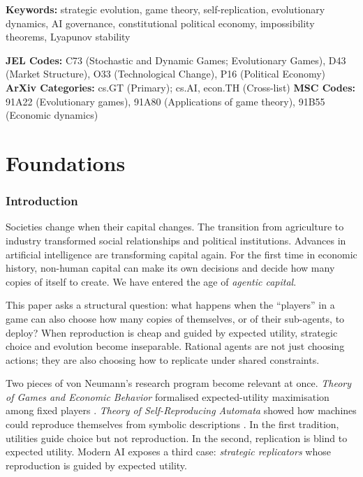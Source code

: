 \documentclass[12pt]{article}
\begin{document}
\noindent\textbf{Keywords:} strategic evolution, game theory, self-replication, evolutionary dynamics, AI governance, constitutional political economy, impossibility theorems, Lyapunov stability

\noindent\textbf{JEL Codes:} C73 (Stochastic and Dynamic Games; Evolutionary Games), D43 (Market Structure), O33 (Technological Change), P16 (Political Economy)
\noindent\textbf{ArXiv Categories:} cs.GT (Primary); cs.AI, econ.TH (Cross-list)
\noindent\textbf{MSC Codes:} 91A22 (Evolutionary games), 91A80 (Applications of game theory), 91B55 (Economic dynamics)

\newpage
\tableofcontents
\newpage


\part{Foundations}


\section{Introduction}

Societies change when their capital changes. The transition from agriculture to industry transformed social relationships and political institutions. Advances in artificial intelligence are transforming capital again. For the first time in economic history, non-human capital can make its own decisions and decide how many copies of itself to create. We have entered the age of \emph{agentic capital}.

This paper asks a structural question: what happens when the ``players'' in a game can also choose how many copies of themselves, or of their sub-agents, to deploy? When reproduction is cheap and guided by expected utility, strategic choice and evolution become inseparable. Rational agents are not just choosing actions; they are also choosing how to replicate under shared constraints.

Two pieces of von Neumann's research program become relevant at once. \emph{Theory of Games and Economic Behavior} formalised expected-utility maximisation among fixed players \citep{vonneumann1944}. \emph{Theory of Self-Reproducing Automata} showed how machines could reproduce themselves from symbolic descriptions \citep{vonneumann1966}. In the first tradition, utilities guide choice but not reproduction. In the second, replication is blind to expected utility. Modern AI exposes a third case: \emph{strategic replicators} whose reproduction is guided by expected utility.
\end{document}
